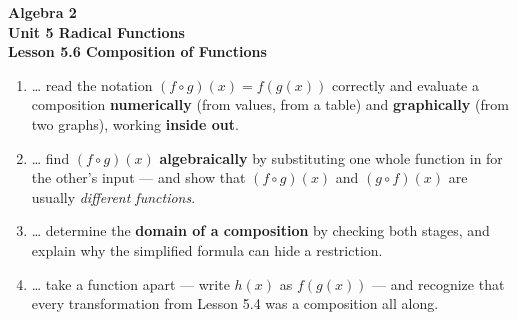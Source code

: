 \documentclass[10pt]{article}
\begin{document}
\vspace{-0.8in}

\begin{center}
  {\color{white}\textbf{\LARGE Algebra 2}}\\[4pt]
  {\color{forestmid}\large\textbf{Unit 5 \quad Radical Functions}}\\[6pt]
  {\color{white}\textbf{\large Lesson 5.6 \quad Composition of Functions}}
\end{center}

\vspace{0.22in}
\namedateperiod
\vspace{0.18in}

\begin{learningtargetbox}
\small
\begin{enumerate}[leftmargin=1.5em, itemsep=5pt]
  \item \ldots{} read the notation $(f\circ g)(x)=f(g(x))$ correctly and evaluate a composition \textbf{numerically} (from values, from a table) and \textbf{graphically} (from two graphs), working \textbf{inside out}.
  \item \ldots{} find $(f\circ g)(x)$ \textbf{algebraically} by substituting one whole function in for the other's input --- and show that $(f\circ g)(x)$ and $(g\circ f)(x)$ are usually \emph{different functions}.
  \item \ldots{} determine the \textbf{domain of a composition} by checking both stages, and explain why the simplified formula can hide a restriction.
  \item \ldots{} take a function apart --- write $h(x)$ as $f(g(x))$ --- and recognize that every transformation from Lesson 5.4 was a composition all along.
\end{enumerate}
\end{learningtargetbox}

\vspace{0.14in}
\end{document}
